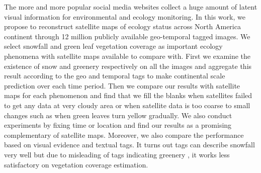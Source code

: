 \documentclass[10pt]{article}
\begin{document}
The more and more popular
social media websites 
collect a huge amount of latent visual information for environmental and ecology monitoring.
In this work, we propose to reconstruct satellite maps of ecology status 
across North America continent 
through 12 million publicly available geo-temporal tagged images.
We select snowfall and green leaf vegetation coverage as important ecology phenomena with satellite 
maps available to compare with.
First we examine the existence of snow and greenery respectively on all the images and 
aggregate this result according to the geo and 
temporal tags to make continental scale prediction over each time period. 
Then we compare our results with satellite maps for each phenomenon and find that we fill the blanks 
when satellites failed to get any data at very cloudy area or when satellite data is too 
coarse to small changes such as when green leaves turn yellow gradually.
We also conduct experiments by fixing time or location and find our results 
as a promising complementary of satellite maps. Moreover, we also compare the performance based on visual evidence and textual tags. 
It turns out tags can describe snowfall very well but due to 
misleading of tags indicating greenery
, it works less satisfactory on vegetation coverage estimation.


%
\end{document}
